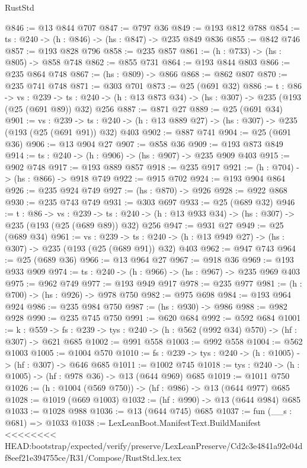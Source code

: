 \begin{lexlean}{RustStd}
\begin{coremodule}
{\begin{coremodule}
{{{{@846 := @13 @844 @707
@847 := @797 @36
@849 := @193 @812 @788
@854 := {ts : @240} -> (h : @846) -> (hs : @847) -> @235 @849 @836
@855 := @842 @746
@857 := @193 @828 @796
@858 := @235 @857
@861 := (h : @733) -> (hs : @805) -> @858 @748
@862 := @855 @731
@864 := @193 @844 @803
@866 := @235 @864 @748
@867 := (hs : @809) -> @866
@868 := @862 @807
@870 := @235 @741 @748
@871 := @303 @701
@873 := @25 (@691 @32)
@886 := {t : @86} ->
  {vs : @239} ->
  {ts : @240} -> (h : @13 @873 @34) -> (hs : @307) -> @235 (@193 (@25 (@691 @89)) @32) @256
@887 := @871 @27
@889 := @25 (@691 @34)
@901 := {vs : @239} ->
  {ts : @240} -> (h : @13 @889 @27) -> (hs : @307) -> @235 (@193 (@25 (@691 @91)) @32) @403
@902 := @887 @741
@904 := @25 (@691 @36)
@906 := @13 @904 @27
@907 := @858 @36
@909 := @193 @873 @849
@914 := {ts : @240} -> (h : @906) -> (hs : @907) -> @235 @909 @403
@915 := @902 @748
@917 := @193 @889 @857
@918 := @235 @917
@921 := (h : @704) -> (hs : @866) -> @918 @749
@922 := @915 @702
@924 := @193 @904 @864
@926 := @235 @924 @749
@927 := (hs : @870) -> @926
@928 := @922 @868
@930 := @235 @743 @749
@931 := @303 @697
@933 := @25 (@689 @32)
@946 := {t : @86} ->
  {vs : @239} ->
  {ts : @240} -> (h : @13 @933 @34) -> (hs : @307) -> @235 (@193 (@25 (@689 @89)) @32) @256
@947 := @931 @27
@949 := @25 (@689 @34)
@961 := {vs : @239} ->
  {ts : @240} -> (h : @13 @949 @27) -> (hs : @307) -> @235 (@193 (@25 (@689 @91)) @32) @403
@962 := @947 @743
@964 := @25 (@689 @36)
@966 := @13 @964 @27
@967 := @918 @36
@969 := @193 @933 @909
@974 := {ts : @240} -> (h : @966) -> (hs : @967) -> @235 @969 @403
@975 := @962 @749
@977 := @193 @949 @917
@978 := @235 @977
@981 := (h : @700) -> (hs : @926) -> @978 @750
@982 := @975 @698
@984 := @193 @964 @924
@986 := @235 @984 @750
@987 := (hs : @930) -> @986
@988 := @982 @928
@990 := @235 @745 @750
@991 := @620 @684
@992 := @592 @684
@1001 := {k : @559} ->
  {fs : @239} -> {tys : @240} -> (h : @562 (@992 @34) @570) -> (hf : @307) -> @621 @685
@1002 := @991 @558
@1003 := @992 @558
@1004 := @562 @1003
@1005 := @1004 @570
@1010 := {fs : @239} -> {tys : @240} -> (h : @1005) -> (hf : @307) -> @646 @685
@1011 := @1002 @745
@1018 := {tys : @240} -> (h : @1005) -> (hf : @978 @36) -> @13 (@644 @969) @685
@1019 := @1011 @750
@1026 := (h : @1004 (@569 @750)) -> (hf : @986) -> @13 (@644 @977) @685
@1028 := @1019 (@669 @1003)
@1032 := (hf : @990) -> @13 (@644 @984) @685
@1033 := @1028 @988
@1036 := @13 (@644 @745) @685
@1037 := fun (__s : @681) => @1033
@1038 := LexLeanBoot.ManifestText.BuildManifest
<<<<<<<< HEAD:bootstrap/expected/verify/preserve/LexLeanPreserve/Cd2c3e4841a92e04df8eef21e394755ce/R31/Compose/RustStd.lex.tex
}}}}
\end{coremodule}}
\end{coremodule}
\end{lexlean}
